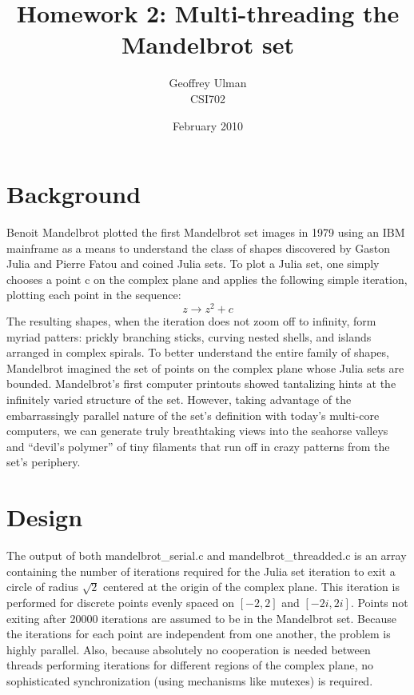 \documentclass{article}
\begin{document}
\title{Homework 2: Multi-threading the Mandelbrot set}
\author{Geoffrey Ulman\\
        CSI702}
\date{February 2010}
\maketitle

\section{Background}

Benoit Mandelbrot plotted the first Mandelbrot set images in 1979 using an IBM mainframe as a means to understand the class of shapes discovered by Gaston Julia and Pierre Fatou and coined Julia sets\cite[p. 219]{chaos}. To plot a Julia set, one simply chooses a point c on the complex plane and applies the following simple iteration, plotting each point in the sequence:
\[ z \rightarrow z^2+c \]
The resulting shapes, when the iteration does not zoom off to infinity, form myriad patters: prickly branching sticks, curving nested shells, and islands arranged in complex spirals. To better understand the entire family of shapes, Mandelbrot imagined the set of points on the complex plane whose Julia sets are bounded. Mandelbrot's first computer printouts showed tantalizing hints at the infinitely varied structure of the set. However, taking advantage of the embarrassingly parallel nature of the set's definition with today's multi-core computers, we can generate truly breathtaking views into the seahorse valleys and ``devil's polymer'' of tiny filaments that run off in crazy patterns from the set's periphery\cite[p. 228]{chaos}.

\section{Design}

The output of both mandelbrot\_serial.c and mandelbrot\_threadded.c is an array containing the number of iterations required for the Julia set iteration to exit a circle of radius \(\sqrt{2}\) centered at the origin of the complex plane. This iteration is performed for discrete points evenly spaced on \( [-2,2] \) and \([-2i,2i]\). Points not exiting after 20000 iterations are assumed to be in the Mandelbrot set. Because the iterations for each point are independent from one another, the problem is highly parallel. Also, because absolutely no cooperation is needed between threads performing iterations for different regions of the complex plane, no sophisticated synchronization (using mechanisms like mutexes) is required.
\end{document}
